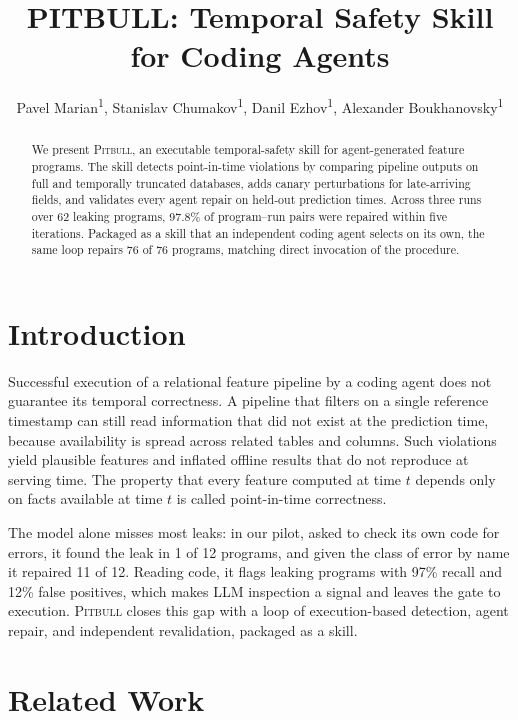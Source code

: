 \documentclass[letterpaper]{article} %
\title{PITBULL: Temporal Safety Skill for Coding Agents}
\author{
    Pavel Marian\textsuperscript{\rm 1},
    Stanislav Chumakov\textsuperscript{\rm 1},
    Danil Ezhov\textsuperscript{\rm 1},
    Alexander Boukhanovsky\textsuperscript{\rm 1}
}
\begin{document}
\maketitle

\begin{abstract}
We present \textsc{Pitbull}, an executable temporal-safety skill for
agent-generated feature programs. The skill detects point-in-time violations
by comparing pipeline outputs on full and temporally truncated databases,
adds canary perturbations for late-arriving fields, and validates every
agent repair on held-out prediction times. Across three runs over 62 leaking
programs, 97.8\% of program--run pairs were repaired within five iterations.
Packaged as a skill that an independent coding agent selects on its own, the
same loop repairs 76 of 76 programs, matching direct invocation of the
procedure.
\end{abstract}

\begin{links}
\end{links}

\section{Introduction}

Successful execution of a relational feature pipeline by a coding agent
does not guarantee its temporal correctness. A pipeline that filters on a
single reference timestamp can still read information that did not exist at
the prediction time, because availability is spread across related tables
and columns. Such violations yield plausible features and inflated offline
results that do not reproduce at serving time. The property that every
feature computed at time $t$ depends only on facts available at time $t$ is
called point-in-time correctness.

The model alone misses most leaks: in our pilot, asked to check its own
code for errors, it found the leak in 1 of 12 programs, and given the class
of error by name it repaired 11 of 12. Reading code, it flags leaking
programs with 97\% recall and 12\% false positives, which makes LLM
inspection a signal and leaves the gate to execution. \textsc{Pitbull}
closes this gap with a loop of execution-based detection, agent repair, and
independent revalidation, packaged as a skill.

\section{Related Work}
\end{document}
